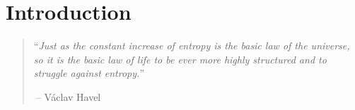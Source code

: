 \documentclass[\toplevelprefix/book-main.tex]{subfiles}
\begin{document}
\chapter{Introduction}
\label{ch:intro}

\begin{quote}
``{\em Just as the constant increase of entropy is the basic law of the universe, so it is the basic law of life to be ever more highly structured and to struggle against entropy.}''

$~$\hfill -- V\'{a}clav Havel
 \end{quote}
\vspace{5mm}


\end{document}
